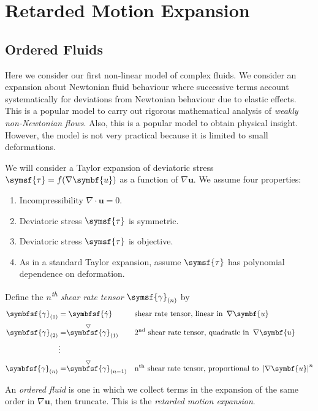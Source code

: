 \documentclass{jknotes}
\begin{document}
\section{Retarded Motion Expansion}
\subsection{Ordered Fluids}
Here we consider our first non-linear model of complex fluids. We consider an
expansion about Newtonian fluid behaviour where successive terms account
systematically for deviations from Newtonian behaviour due to elastic effects.
This is a popular model to carry out rigorous mathematical analysis of
\emph{weakly non-Newtonian flows}. Also, this is a popular model to obtain
physical insight. However, the model is not very practical because it is
limited to small deformations.

We will consider a Taylor expansion of deviatoric stress $\symsf{\tau} =
f(\nabla \symbf{u})$ as a function of $\nabla \symbf{u}$. We assume four
properties:
\begin{enumerate}
	\item Incompressibility $\nabla\cdot\symbf{u} = 0$.
	\item Deviatoric stress $\symsf{\tau}$ is symmetric.
	\item Deviatoric stress $\symsf{\tau}$ is objective.
	\item As in a standard Taylor expansion, assume $\symsf{\tau}$ has
		polynomial dependence on deformation.
\end{enumerate}

Define the \emph{$n$\textsuperscript{th} shear rate tensor}
$\symsf{\gamma}_{(n)}$ by
\begin{align}
	\symbfsf{\gamma}_{(1)} &= \symbfsf{\srate} && \text{shear rate tensor, linear in}
	\,\,\, \nabla \symbf{u} \\
	\symbfsf{\gamma}_{(2)} &=
	\stackrel{\bigtriangledown}{\symbfsf{\gamma}}_{(1)} &&
	\text{2\textsuperscript{nd} shear rate tensor, quadratic in}
	\,\,\, \nabla \symbf{u} \\
	&\vdots \\
	\symbfsf{\gamma}_{(n)} &=
	\stackrel{\bigtriangledown}{\symbfsf{\gamma}}_{(n-1)} &&
	\text{n\textsuperscript{th} shear rate tensor, proportional to}
	\,\,\, \abs{\nabla \symbf{u}}^n \\
\end{align}

An \emph{ordered fluid} is one in which we collect terms in the expansion of
the same order in $\nabla \symbf{u}$, then truncate. This is the
\emph{retarded motion expansion}.
\end{document}

